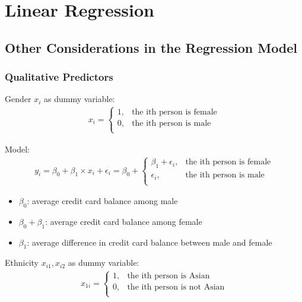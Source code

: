 \documentclass[12pt,a4paper]{article}%
\theoremstyle{definition}
\theoremstyle{plain}
\numberwithin{equation}{section}
\newcounter{subsubsubsection}[subsubsection]
\begin{document}
\setcounter{section}{2}
\section{Linear Regression}
\label{Linear Regression}
\subsection{\textbf{Other Considerations in the Regression Model}}
\subsubsection{\textbf{Qualitative Predictors}}

\subsubsubsection{\color{blue}{Predictors with Two levels}}
Gender $x_{i}$ as dummy variable:\\
\begin{gather}
x_{i} = \left\{
\begin{array}{ll}
1, & \mbox{the ith person is female}\\
0, & \mbox{the ith person is male}\\
\end{array} \right.
\end{gather}

Model: 
\begin{gather}
y_{i} = \beta_{0}+\beta_{1} \times x_{i} + \epsilon_{i} = \beta_{0} + \left\{
\begin{array}{ll}
\beta_{1} +\epsilon_{i}, & \mbox{the ith person is female}\\
\epsilon_{i}, & \mbox{the ith person is male}\\
\end{array} \right.
\end{gather}

\begin{itemize}
\item $\beta_{0}$: average credit card balance among male
\item $\beta_{0}+\beta_{1}$: average credit card balance among female
\item $\beta_{1}$: average difference in credit card balance between male and female
\end{itemize}

\subsubsubsection{\color{blue}{Predictors with more than Two Levels}}
Ethnicity $x_{i1},x_{i2}$ as dummy variable:\\
\begin{gather}
x_{1i} = \left\{
\begin{array}{ll}
1, & \mbox{the ith person is Asian}\\
0, & \mbox{the ith person is not Asian}\\
\end{array} \right.
\end{gather}
\end{document}
